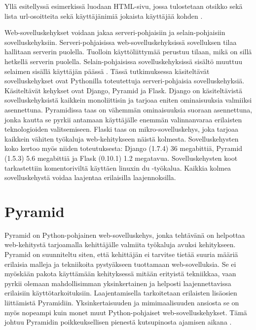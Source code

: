 \documentclass[utf8]{gradu3}
\begin{document}
Yllä esitellyssä esimerkissä luodaan HTML-sivu, jossa tulostetaan otsikko sekä lista url-osoitteita sekä käyttäjänimiä jokaista käyttäjää kohden \parencite{jinja}.

Web-sovelluskehykset voidaan jakaa serveri-pohjaisiin ja selain-pohjaisiin sovelluskehyksiin. Serveri-pohjaisissa web-sovelluskehyksissä sovelluksen tilaa hallitaan serverin puolella. Tuolloin käyttöliittymää perustuu tilaan, mikä on sillä hetkellä serverin puolella. Selain-pohjaisissa sovelluskehyksissä sisältö muuttuu selaimen sisällä käyttäjän päässä \parencite{vosloo}. Tässä tutkimuksessa käsiteltävät sovelluskehykset ovat Pythonilla toteutettuja serveri-pohjaisia sovelluskehyksiä. Käsiteltävät kehykset ovat Django, Pyramid ja Flask. Django on käsiteltävistä sovelluskehyksistä kaikkein monoliittisin ja tarjoaa eniten ominaisuuksia valmiiksi asennettuna. Pyramidissa taas on vähemmän ominaisuuksia suoraan asennettuna, jonka kautta se pyrkii antamaan käyttäjälle enemmän valinnanvaraa erilaisten teknologioiden valitsemiseen. Flaski taas on mikro-sovelluskehys, joka tarjoaa kaikkein vähiten työkaluja web-kehitykseen näistä kolmesta. Sovelluskehysten koko kertoo myös niiden toteutuksesta: Django (1.7.4) 36 megabittiä, Pyramid (1.5.3) 5.6 megabittiä ja Flask (0.10.1) 1.2 megatavua. Sovelluskehysten koot tarkastettiin komentoriviltä käyttäen linuxin du -työkalua. Kaikkia kolmea sovelluskehystä voidaa laajentaa erilaisilla laajennoksilla.


\section{Pyramid}

Pyramid on Python-pohjainen web-sovelluskehys, jonka tehtävänä on helpottaa web-kehitystä tarjoamalla
kehittäjälle valmiita työkaluja avuksi kehitykseen. Pyramid on suunniteltu siten, että kehittäjän ei tarvitse tietää suuria määriä erilaisia malleja ja tekniikoita pystyäkseen tuottamaan web-sovelluksia. Se ei myöskään pakota käyttämään kehityksessä mitään erityistä tekniikkaa, vaan pyrkii olemaan mahdollisimman yksinkertainen ja helposti laajennettavissa erilaisiin käyttötarkoituksiin. Laajentamisella tarkoitetaan erilaisten lisäosien liittämistä Pyramidiin. Yksinkertaisuuden ja mimimaalisuuden ansiosta se on myös nopeampi kuin monet muut Python-pohjaiset web-sovelluskehykset. Tämä johtuu Pyramidin poikkeuksellisen pienestä kutsupinosta ajamisen aikana \parencite{pyramid_intr}. 
\end{document}
